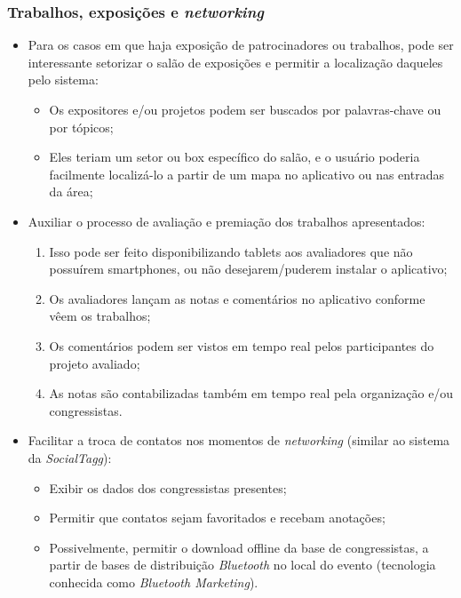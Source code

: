 \documentclass[12pt,a4paper,twoside,hyphens,english,brazil]{abntex2}
\begin{document}
\subsubsection*{Trabalhos, exposições e \emph{networking}}
\begin{itemize}
	\item Para os casos em que haja exposição de patrocinadores ou trabalhos, pode ser interessante setorizar o salão de exposições e permitir a localização daqueles pelo sistema:
		\begin{itemize}
			\item Os expositores e/ou projetos podem ser buscados por palavras-chave ou por tópicos;
			\item Eles teriam um setor ou box específico do salão, e o usuário poderia facilmente localizá-lo a partir de um mapa no aplicativo ou nas entradas da área;
		\end{itemize}
	\item Auxiliar o processo de avaliação e premiação dos trabalhos apresentados:
		\begin{enumerate}
			\item Isso pode ser feito disponibilizando tablets aos avaliadores que não possuírem smartphones, ou não desejarem/puderem instalar o aplicativo;
			\item Os avaliadores lançam as notas e comentários no aplicativo conforme vêem os trabalhos;
			\item Os comentários podem ser vistos em tempo real pelos participantes do projeto avaliado;
			\item As notas são contabilizadas também em tempo real pela organização e/ou congressistas.
		\end{enumerate}
	\item Facilitar a troca de contatos nos momentos de \emph{networking} (similar ao sistema da \emph{SocialTagg}\cite{socialtagg}):
		\begin{itemize}
			\item Exibir os dados dos congressistas presentes;
			\item Permitir que contatos sejam favoritados e recebam anotações;
			\item Possivelmente, permitir o download offline da base de congressistas, a partir de bases de distribuição \emph{Bluetooth} no local do evento (tecnologia conhecida como \emph{Bluetooth Marketing}).
		\end{itemize}
\end{itemize}
\end{document}
